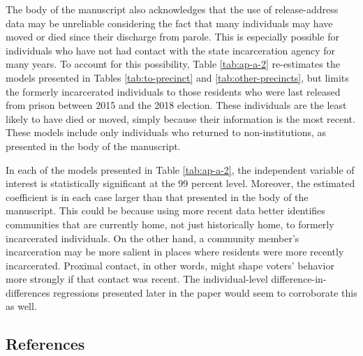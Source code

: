 \documentclass[
  12pt,
]{article}
\begin{document}
The body of the manuscript also acknowledges that the use of release-address data may be unreliable considering the fact that many individuals may have moved or died since their discharge from parole. This is especially possible for individuals who have not had contact with the state incarceration agency for many years. To account for this possibility, Table \ref{tab:ap-a-2} re-estimates the models presented in Tables \ref{tab:to-precinct} and \ref{tab:other-precincts}, but limits the formerly incarcerated individuals to those residents who were last released from prison between 2015 and the 2018 election. These individuals are the least likely to have died or moved, simply because their information is the most recent. These models include only individuals who returned to non-institutions, as presented in the body of the manuscript.

\begin{singlespace}


\end{singlespace}

In each of the models presented in Table \ref{tab:ap-a-2}, the independent variable of interest is statistically significant at the 99 percent level. Moreover, the estimated coefficient is in each case larger than that presented in the body of the manuscript. This could be because using more recent data better identifies communities that are currently home, not just historically home, to formerly incarcerated individuals. On the other hand, a community member's incarceration may be more salient in places where residents were more recently incarcerated. Proximal contact, in other words, might shape voters' behavior more strongly if that contact was recent. The individual-level difference-in-differences regressions presented later in the paper would seem to corroborate this as well.

\newpage

\hypertarget{references}{%
\subsection*{References}\label{references}}
\end{document}
